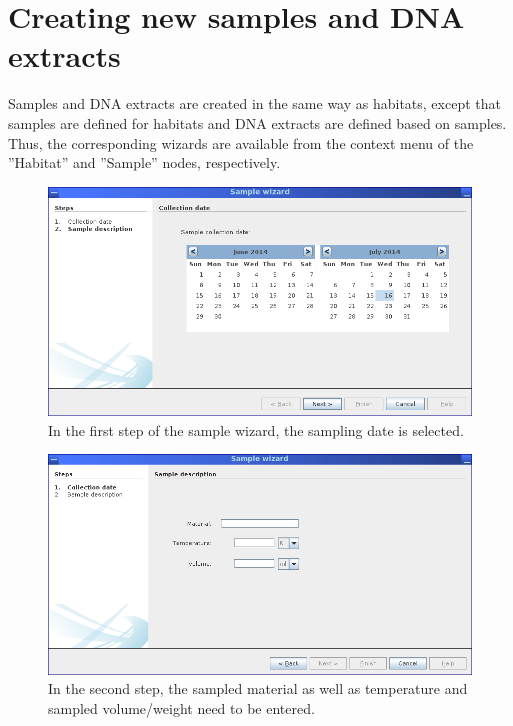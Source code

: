 \section{Creating new samples and DNA extracts}

Samples and DNA extracts are created in the same way as habitats, except that samples are defined for
habitats and DNA extracts are defined based on samples. Thus, the corresponding wizards are available
from the context menu of the ''Habitat'' and ''Sample'' nodes, respectively.

\begin{figure}[H]
\centering
\includegraphics[width=.8\textwidth]{img/mgx/samplewiz1}
\caption[Sample wizard]{In the first step of the sample wizard, the sampling date is selected.}
\label{samplewiz1}
\end{figure}

\begin{figure}[H]
\centering
\includegraphics[width=.8\textwidth]{img/mgx/samplewiz2}
\caption[Sample wizard]{In the second step, the sampled material as well as temperature and sampled volume/weight
need to be entered.}
\label{samplewiz2}
\end{figure}

